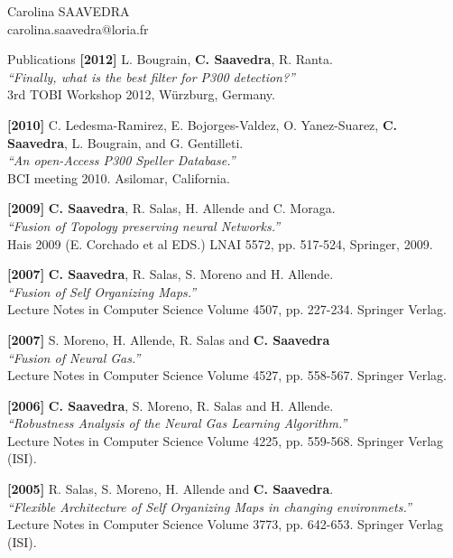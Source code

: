 \documentclass[letterpaper]{article}
\begin{document}
\begin{cv}{{\huge Carolina SAAVEDRA}\\
carolina.saavedra@loria.fr}
\begin{cvlist}{Publications}
\textbf{[2012]} L. Bougrain, \textbf{C. Saavedra}, R. Ranta.\\
{\it ``Finally, what is the best filter for P300 detection?''}\\
3rd TOBI Workshop 2012, W\"urzburg, Germany.

\textbf{[2010]} C. Ledesma-Ramirez, E. Bojorges-Valdez, O. Yanez-Suarez,
 \textbf{C. Saavedra}, L. Bougrain, and G. Gentilleti.\\
{\it ``An open-Access P300 Speller Database.''}\\
BCI meeting 2010. Asilomar, California.


\textbf{[2009]} \textbf{C. Saavedra}, R. Salas, H. Allende and C. Moraga.\\
{\it ``Fusion of Topology preserving neural Networks.''}\\
Hais 2009 (E. Corchado et al EDS.) LNAI 5572, pp. 517-524, Springer, 2009.

\textbf{[2007]} \textbf{C. Saavedra}, R. Salas, S. Moreno and H. Allende.\\
{\it ``Fusion of Self Organizing Maps.''}\\
Lecture Notes in Computer Science Volume 4507, pp. 227-234. Springer
Verlag.

\textbf{[2007]} S. Moreno, H. Allende, R. Salas and \textbf{C. Saavedra}\\
{\it ``Fusion of Neural Gas.''}\\
Lecture Notes in Computer Science Volume 4527, pp. 558-567. Springer
Verlag.

\textbf{[2006]} \textbf{C. Saavedra}, S. Moreno, R. Salas and H. Allende.\\
{\it ``Robustness Analysis of the Neural Gas Learning Algorithm.''}\\
Lecture Notes in Computer Science Volume 4225, pp. 559-568. Springer
Verlag (ISI).

\textbf{[2005]} R. Salas, S. Moreno, H. Allende and \textbf{C. Saavedra}.\\
{\it ``Flexible Architecture of Self Organizing Maps in changing environmets.''}\\
Lecture Notes in Computer Science Volume 3773, pp. 642-653. Springer
Verlag (ISI).


\end{cvlist}
\end{cv}
\end{document}
